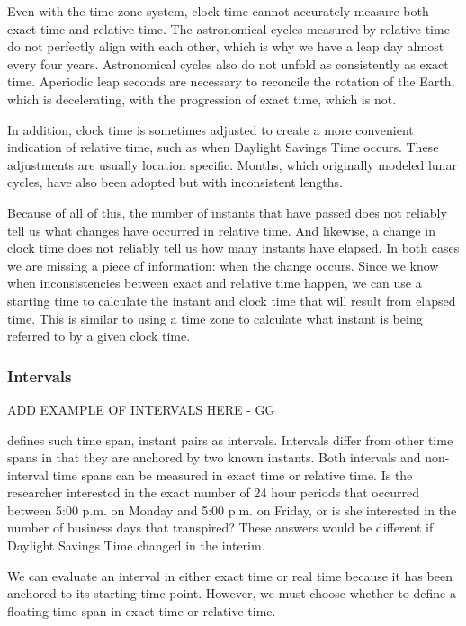 \documentclass[article]{jss}
\begin{document}
Even with the time zone system, clock time cannot accurately measure both exact time and relative time. The astronomical cycles measured by relative time do not perfectly align with each other, which is why we have a leap day almost every four years. Astronomical cycles also do not unfold as consistently as exact time. Aperiodic leap seconds are necessary to reconcile the rotation of the Earth, which is decelerating, with the progression of exact time, which is not.

In addition, clock time is sometimes adjusted to create a more convenient indication of relative time, such as when Daylight Savings Time occurs.  These adjustments are usually location specific. Months, which originally modeled lunar cycles, have also been adopted but with inconsistent lengths.

Because of all of this, the number of instants that have passed does not reliably tell us what changes have occurred in relative time. And likewise, a change in clock time does not reliably tell us how many instants have elapsed. In both cases we are missing a piece of information: when the change occurs. Since we know when inconsistencies between exact and relative time happen, we can use a starting time to calculate the instant and clock time that will result from elapsed time. This is similar to using a time zone to calculate what instant is being referred to by a given clock time.

\subsubsection{Intervals}

ADD EXAMPLE OF INTERVALS HERE - GG

 defines such time span, instant pairs as intervals. Intervals differ from other time spans in that they are anchored by two known instants. Both intervals and non-interval time spans can be measured in exact time or relative time. Is the researcher interested in the exact number of 24 hour periods that occurred between 5:00 p.m. on Monday and 5:00 p.m. on Friday, or is she interested in the number of business days that transpired? These answers would be different if Daylight Savings Time changed in the interim.

We can evaluate an interval in either exact time or real time because it has been anchored to its starting time point. However, we must choose whether to define a floating time span in exact time or relative time.
\end{document}

